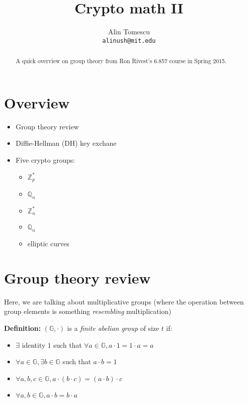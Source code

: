 \documentclass[11pt]{article}
\newcommand{\Zp}{\mathbb{Z}^{\ast}_p}
\newcommand{\Zn}{\mathbb{Z}^{\ast}_n}
\newcommand{\Qp}{\mathbb{Q}_n}
\newcommand{\Qn}{\mathbb{Q}_n}
\newcommand{\G}{\mathbb{G}}
\newcommand{\definition}{\textbf{Definition:} }
\begin{document}
\title{Crypto math II}
\author{Alin Tomescu\\
  \texttt{alinush@mit.edu}}

\maketitle

\begin{abstract}
A quick overview on group theory from Ron Rivest's 6.857 course in Spring 2015.
\end{abstract}

\section{Overview}

\begin{itemize}
  \item Group theory review
  \item Diffie-Hellman (DH) key exchane
  \item Five crypto groups:
  \begin{itemize}
    \item $\Zp$
    \item $\Qp$
    \item $\Zn$
    \item $\Qn$
    \item elliptic curves
  \end{itemize}
\end{itemize}

\section{Group theory review}

Here, we are talking about multiplicative groups (where the operation between
group elements is something \emph{resembling} multiplication)

\definition $(\G, \cdot)$ is a \emph{finite abelian group} of size $t$ if:

\begin{itemize}
  \item $\exists$ identity $1$ such that $\forall a \in \G, a\cdot 1 = 1\cdot a = a$
  \item $\forall a     \in \G, \exists b \in \G$ such that $a\cdot b = 1$
  \item $\forall a,b,c \in \G, a\cdot (b\cdot c) = (a\cdot b)\cdot c$
  \item $\forall a,b   \in \G, a\cdot b = b\cdot a$
\end{itemize}
\end{document}
